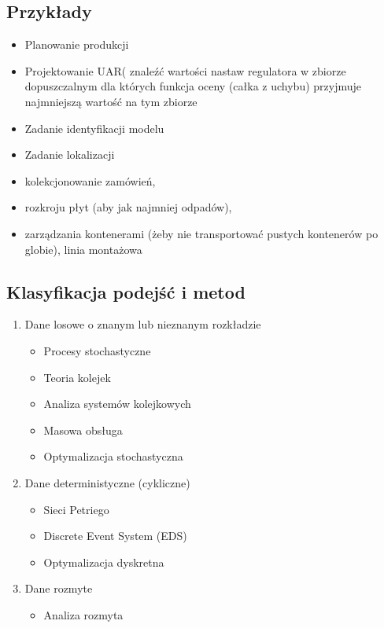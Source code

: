 \documentclass[10pt, a
4paper]{article}
\begin{document}
\subsection{Przykłady}
\begin{itemize}
\item Planowanie produkcji
\item Projektowanie UAR( znaleźć wartości nastaw regulatora w zbiorze dopuszczalnym dla których funkcja oceny (całka z uchybu) przyjmuje  najmniejszą wartość na tym zbiorze
\item Zadanie identyfikacji modelu
\item Zadanie lokalizacji
\item kolekcjonowanie zamówień, 
\item rozkroju płyt (aby jak najmniej odpadów), 
\item zarządzania kontenerami (żeby nie transportować pustych kontenerów po globie), linia montażowa
\end{itemize}

\subsection{Klasyfikacja podejść i metod}
\begin{enumerate}
\item Dane losowe o znanym lub nieznanym rozkładzie
\begin{itemize}
\item Procesy stochastyczne
\item Teoria kolejek
\item Analiza systemów kolejkowych
\item Masowa obsługa
\item Optymalizacja stochastyczna
\end{itemize}
\item Dane deterministyczne (cykliczne)
\begin{itemize}
\item Sieci Petriego
\item Discrete Event System (EDS)
\item Optymalizacja dyskretna
\end{itemize}
\item Dane rozmyte
\begin{itemize}
\item Analiza rozmyta
\end{itemize}
\end{enumerate}
\end{document}
